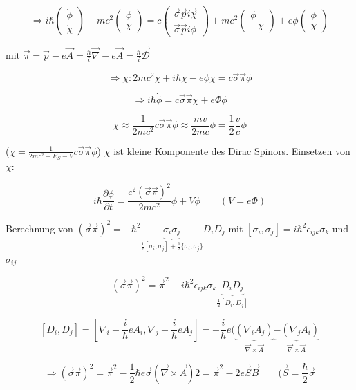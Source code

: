 \[\Rightarrow i\hbar\begin{pmatrix}\dot \phi\\ \dot\chi\end{pmatrix} + mc^2\begin{pmatrix} \phi\\ \chi\end{pmatrix} = c \begin{pmatrix}\vec \sigma \vec pi \vec \chi\\ \vec \sigma \vec pi \phi\end{pmatrix}+mc^2\begin{pmatrix} \phi\\ -\chi\end{pmatrix}+e\phi \begin{pmatrix} \phi\\ \chi\end{pmatrix}\]

mit \(\vec\pi = \vec p -e\vec A = \frac{\hbar}{i}\vec \nabla-e\vec A= \frac{\hbar}{i}\vec{\mathcal D} \)

\[\Rightarrow \chi: 2mc^2\chi+i\hbar \dot\chi - e\phi \chi = c\vec\sigma\vec\pi\phi\]

\[\Rightarrow i\hbar\dot\phi = c \vec\sigma\vec\pi\chi + e\Phi \phi\]

\[\chi \approx \frac{1}{2mc^2} c\vec\sigma\vec\pi\phi\approx \frac{mv}{2mc}\phi = \frac{1}{2}\frac{v}{c}\phi\]

(\(\chi = \frac{1}{2mc^2+E_S-V}c\vec\sigma\vec\pi\phi\)) \(\chi\) ist kleine Komponente des Dirac Spinors. Einsetzen von \(\chi\):

\[i\hbar \frac{\partial \phi}{\partial t} = \frac{c^2(\vec\sigma\vec\pi)^2}{2mc^2}\phi+V\phi\qquad (V=e\Phi)\]

Berechnung von \((\vec\sigma\vec\pi)^2=-\hbar^2\underbrace{\sigma_i\sigma_j}_{\frac{1}{2}[\sigma_i,\sigma_j]+\frac{1}{2}\{\sigma_i,\sigma_j\}}D_iD_j\) mit \([\sigma_i,\sigma_j]=i\hbar^2\epsilon_{ijk}\sigma_k \) und \( \sigma_{ij}\)

\[(\vec\sigma\vec\pi)^2=\vec\pi^2 -i\hbar^2\epsilon_{ijk}\sigma_k \underbrace{D_iD_j}_{\frac{1}{2}[D_i,D_j]} \]

\[[D_i,D_j]=[\nabla_i-\frac{i}{\hbar}eA_i,\nabla_j-\frac{i}{\hbar}eA_j ] = -\frac{i}{\hbar}e(\underbrace{(\nabla_iA_j)}_{\vec\nabla\times\vec A}\underbrace{-(\nabla_j A_i)}_{\vec\nabla\times\vec A}\]

\[\Rightarrow (\vec\sigma\vec\pi)^2 = \vec \pi^2 -\frac{1}{2}\hbar e \vec\sigma (\vec\nabla\times\vec A)2= \vec \pi^2 -2e\vec S\vec B \qquad (\vec S=\frac{\hbar}{2}\vec\sigma\]


